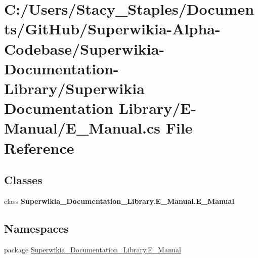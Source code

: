 \hypertarget{_e-_manual_2_e___manual_8cs}{\section{C\+:/\+Users/\+Stacy\+\_\+\+Staples/\+Documents/\+Git\+Hub/\+Superwikia-\/\+Alpha-\/\+Codebase/\+Superwikia-\/\+Documentation-\/\+Library/\+Superwikia Documentation Library/\+E-\/\+Manual/\+E\+\_\+\+Manual.cs File Reference}
\label{_e-_manual_2_e___manual_8cs}
}
\subsection*{Classes}
\begin{DoxyCompactItemize}
\item 
class {\bfseries Superwikia\+\_\+\+Documentation\+\_\+\+Library.\+E\+\_\+\+Manual.\+E\+\_\+\+Manual}
\end{DoxyCompactItemize}
\subsection*{Namespaces}
\begin{DoxyCompactItemize}
\item 
package \hyperlink{namespace_superwikia___documentation___library_1_1_e___manual}{Superwikia\+\_\+\+Documentation\+\_\+\+Library.\+E\+\_\+\+Manual}
\end{DoxyCompactItemize}
